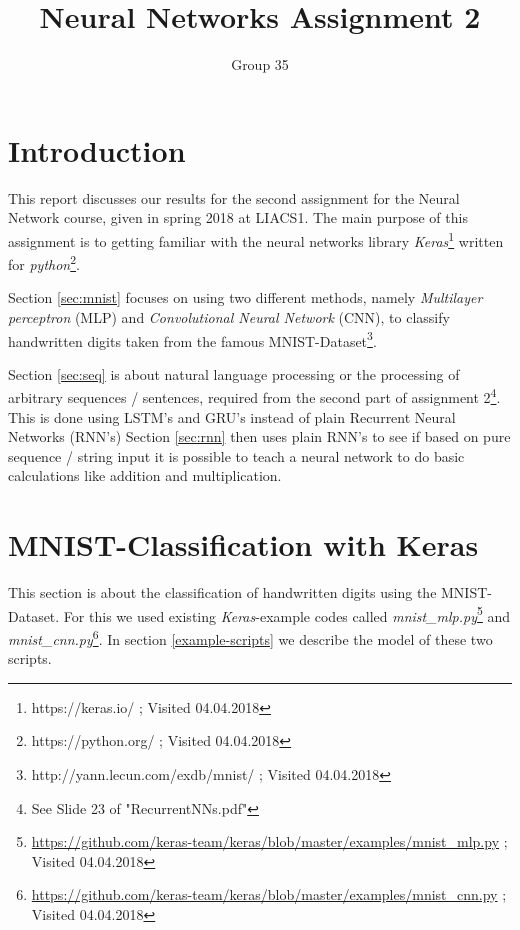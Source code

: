 \documentclass{article}[]
\begin{document}
\title{Neural Networks Assignment 2}
\author{Group 35}
\maketitle
\lstset{
  basicstyle=\ttfamily,
  keywordstyle=\bfseries,
  language=Java,
  frame=single,
  aboveskip=11pt,
  belowskip=11pt,
  breaklines=true,
  breakatwhitespace=false,
  showspaces=false,
  showstringspaces=false,
  numbers=left,
  stepnumber=1,    
  firstnumber=1,
  numberfirstline=true
}

\section{Introduction}
This report discusses our results for the second assignment for the Neural Network
course, given in spring 2018 at LIACS1.
The main purpose of this assignment is to getting familiar with the neural networks library \textit{Keras}\footnote{https://keras.io/ ; Visited 04.04.2018} written for \textit{python}\footnote{https://python.org/ ; Visited 04.04.2018}.

Section \ref{sec:mnist} focuses on using two different methods, namely \emph{Multilayer perceptron} (MLP) and \emph{Convolutional Neural Network} (CNN), to classify handwritten digits taken from the famous MNIST-Dataset\footnote{http://yann.lecun.com/exdb/mnist/ ; Visited 04.04.2018}.

Section \ref{sec:seq} is about natural language processing or the processing of arbitrary sequences / sentences,  required from the second part of assignment 2\footnote{See Slide 23 of "RecurrentNNs.pdf"}. This is done using LSTM's and GRU's instead of plain Recurrent Neural Networks (RNN's)
Section \ref{sec:rnn} then uses plain RNN's to see if based on pure sequence / string input it is possible to teach a neural network to do basic calculations like addition and multiplication.

\section{MNIST-Classification with Keras}
\label{task-1}
\label{sec:mnist}
This section is about the classification of handwritten digits using the MNIST-Dataset.
For this we used existing \textit{Keras}-example codes called \textit{mnist\_mlp.py}\footnote{\url{https://github.com/keras-team/keras/blob/master/examples/mnist_mlp.py} ; Visited 04.04.2018} and \textit{mnist\_cnn.py}\footnote{\url{https://github.com/keras-team/keras/blob/master/examples/mnist_cnn.py} ; Visited 04.04.2018}.
In section \ref{example-scripts} we describe the model of these two scripts.
\end{document}
